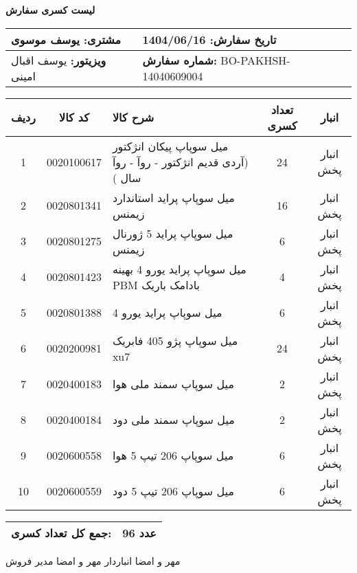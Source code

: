 \documentclass[a4paper,12pt]{article}
\begin{document}
\begin{center}
    {\Huge \textbf{   لیست کسری سفارش   }} \\
\end{center}

\vspace{0.5cm}

\noindent
\begin{tabular}{|p{7cm}|p{7cm}|}
\hline
\textbf{مشتری:} یوسف موسوی & \textbf{تاریخ سفارش:} 1404/06/16 \\
\hline
\textbf{ویزیتور:} یوسف اقبال امینی & \textbf{شماره سفارش:} BO-PAKHSH-14040609004 \\
\hline
\end{tabular}

\vspace{0.5cm}

\begin{longtable}{|c|c|p{6cm}|c|c|}
\hline
\rowcolor{headerblue} \color{white}
\textbf{ردیف} &  \textbf{کد کالا} & \textbf{شرح کالا} & \textbf{تعداد کسری} & \textbf{انبار} \\
\hline
\endhead
1 & 0020100617 & میل سوپاپ پیکان انژکتور (آردی قدیم انژکتور - روآ - روآ سال ) & 24 & انبار پخش \\
\hline
2 & 0020801341 & میل سوپاپ پراید استاندارد زیمنس & 16 & انبار پخش \\
\hline
3 & 0020801275 & میل سوپاپ پراید 5 ژورنال زیمنس & 6 & انبار پخش \\
\hline
4 & 0020801423 & ميل سوپاپ پرايد يورو 4 بهينه PBM بادامک باريک & 4 & انبار پخش \\
\hline
5 & 0020801388 & میل سوپاپ پراید یورو 4 & 6 & انبار پخش \\
\hline
6 & 0020200981 & میل سوپاپ پژو 405 فابریک xu7 & 24 & انبار پخش \\
\hline
7 & 0020400183 & میل سوپاپ سمند ملی هوا & 2 & انبار پخش \\
\hline
8 & 0020400184 & میل سوپاپ سمند ملی دود & 2 & انبار پخش \\
\hline
9 & 0020600558 & میل سوپاپ 206 تیپ 5 هوا & 6 & انبار پخش \\
\hline
10 & 0020600559 & میل سوپاپ 206 تیپ 5 دود & 6 & انبار پخش \\
\hline

\end{longtable}

\vspace{0.3cm}
\noindent
\begin{tabular}{|p{7cm}|p{7cm}|}
\hline
\textbf{جمع کل تعداد کسری:} & 96 عدد \\
\hline
\end{tabular}

\vspace{1.5cm}

\noindent
مهر و امضا انباردار \hspace{8cm} مهر و امضا مدیر فروش
\end{document}
